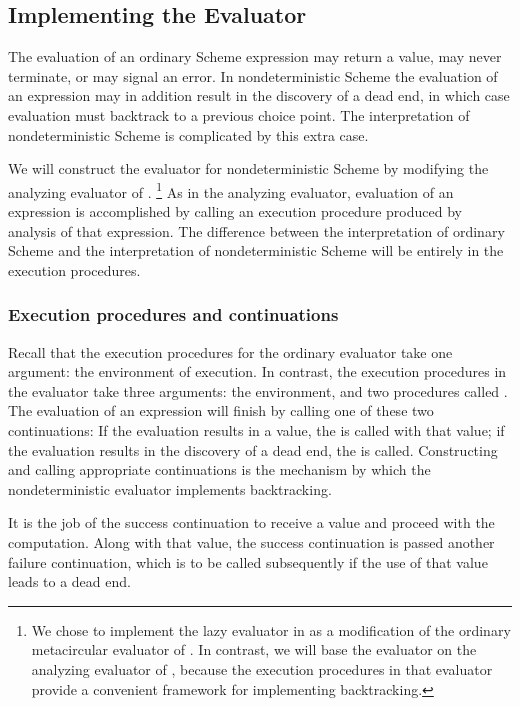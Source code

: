 \subsection{Implementing the  Evaluator}
\label{Section 4.3.3}

The evaluation of an ordinary Scheme expression may return a value, may never terminate, or may signal an error.
In nondeterministic Scheme the evaluation of an expression may in addition result in the discovery of a dead end, in which case evaluation must backtrack to a previous choice point.
The interpretation of nondeterministic Scheme is complicated by this extra case.

We will construct the  evaluator for nondeterministic Scheme by modifying the analyzing evaluator of .%
\footnote{
	We chose to implement the lazy evaluator in  as a modification of the ordinary metacircular evaluator of .
	In contrast, we will base the  evaluator on the analyzing evaluator of , because the execution procedures in that evaluator provide a convenient framework for implementing backtracking.
}
	As in the analyzing evaluator, evaluation of an expression is accomplished by calling an execution procedure produced by analysis of that expression.
	The difference between the interpretation of ordinary Scheme and the interpretation of nondeterministic Scheme will be entirely in the execution procedures.



\subsubsection*{Execution procedures and continuations}

Recall that the execution procedures for the ordinary evaluator take one argument:
the environment of execution.
In contrast, the execution procedures in the  evaluator take three arguments:
the environment, and two procedures called .
The evaluation of an expression will finish by calling one of these two continuations:
If the evaluation results in a value, the  is called with that value;
if the evaluation results in the discovery of a dead end, the  is called.
Constructing and calling appropriate continuations is the mechanism by which the nondeterministic evaluator implements backtracking.

It is the job of the success continuation to receive a value and proceed with the computation.
Along with that value, the success continuation is passed another failure continuation, which is to be called subsequently if the use of that value leads to a dead end.

